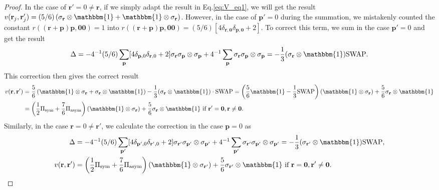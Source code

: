 \documentclass[aps,%
twocolumn,%
floatfix,%
pra,%
amsfonts,%
groupedaddress,%
superscriptaddress]{revtex4-2}%
\newcommand{\1}{\mathbbm{1}}
\begin{document}
\begin{proof}
    In the case of $\mathbf{r}'= 0 \neq \mathbf{r}$, if we simply adapt the result in Eq.\eqref{eq:V_eq1}, we will get the result $v({\mathbf{r}_j}, {\mathbf{r}_j'}) =({5}/{6})\left(\sigma_{\mathbf{r}}\otimes \1 +\1\otimes \sigma_{\mathbf{r}} \right)$. However, in the case of $\mathbf{p}' = 0$ during the summation, we mistakenly counted the constant $r((\mathbf{r}+ \mathbf{p})\mathbf{p}, \mathbf{0}\mathbf{0}) = 1$ into $r((\mathbf{r}+ \mathbf{p})\mathbf{p}, \mathbf{0}\mathbf{0}) = (5/6)[4\delta_{\mathbf{r},\mathbf{0}}\delta_{\mathbf{p},\mathbf{0}} +2]$. To correct this term, we sum in the case $\mathbf{p}' = 0$ and get the result
    \begin{align}
        \Delta = -4^{-1}(5/6)\sum_{\mathbf{p}} [4\delta_{\mathbf{p},0}\delta_{\mathbf{r},0} + 2]\sigma_{\mathbf{r}}\sigma_{\mathbf{p}} \otimes \sigma_{\mathbf{p}} + 4^{-1} \sum_{\mathbf{p}} \sigma_{\mathbf{r}}\sigma_{\mathbf{p}} \otimes \sigma_{\mathbf{p}} = - \frac{1}{3}(\sigma_{\mathbf{r}} \otimes \1)\text{SWAP}.
    \end{align} 
    This correction then gives the correct result
    \begin{align}
        v({\mathbf{r}}, {\mathbf{r}'}) &=\frac{5}{6}\left(\1\otimes \sigma_{\mathbf{r}} +  \sigma_{\mathbf{r}}\otimes\1 \right) -  \frac{1}{3}(\sigma_{\mathbf{r}} \otimes \1) \cdot \text{SWAP} = \left(\frac{5}{6} \1 - \frac{1}{3}\text{SWAP}\right)(\1 \otimes \sigma_{\mathbf{r}}) + \frac{5}{6}\sigma_{\mathbf{r}}\otimes\1 \notag\\
        &= \left(\frac{1}{2} \Pi_{\mathrm{sym}} + \frac{7}{6} \Pi_{\mathrm{asym}}\right)(\1 \otimes \sigma_{\mathbf{r}}) + \frac{5}{6}\sigma_{\mathbf{r}}\otimes\1 \text{~if~} \mathbf{r}' = \mathbf{0},  \mathbf{r}\neq \mathbf{0}.
    \end{align}
    Similarly, in the case $\mathbf{r}= 0 \neq \mathbf{r}'$, we calculate the correction in the case $\mathbf{p} = 0$ as
    \begin{align}
        \Delta &= -4^{-1}(5/6)\sum_{\mathbf{p}'}[4\delta_{\mathbf{p}',0}\delta_{\mathbf{r}',0} + 2]\sigma_{\mathbf{r}'}\sigma_{\mathbf{p}'} \otimes \sigma_{\mathbf{p}'} + 4^{-1} \sum_{\mathbf{p}'} \sigma_{\mathbf{r}'}\sigma_{\mathbf{p}'} \otimes \sigma_{\mathbf{p}'} = - \frac{1}{3}(\sigma_{\mathbf{r}'} \otimes \1)\text{SWAP},\\
        v({\mathbf{r}}, {\mathbf{r}'}) &= \left(\frac{1}{2} \Pi_{\mathrm{sym}} + \frac{7}{6} \Pi_{\mathrm{asym}}\right)(\1 \otimes \sigma_{\mathbf{r}'}) + \frac{5}{6}\sigma_{\mathbf{r}'}\otimes\1 \text{~if~} \mathbf{r} = \mathbf{0},  \mathbf{r}'\neq \mathbf{0}.

\end{align}
\end{proof}
\end{document}
